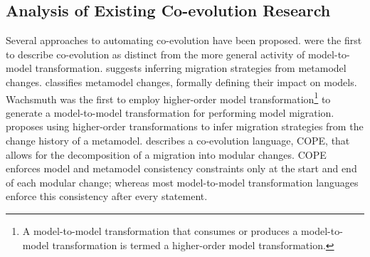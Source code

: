 \subsection{Analysis of Existing Co-evolution Research}
\label{sub:analysis_of_existing_techniques}
Several approaches to automating co-evolution have been proposed. \cite{sprinkle04domain} were the first to describe co-evolution as distinct from the more general activity of model-to-model transformation. \cite{gruschko07towards} suggests inferring migration strategies from metamodel changes. \cite{wachsmuth07metamodel} classifies metamodel changes, formally defining their impact on models. Wachsmuth was the first to employ higher-order model transformation\footnote{A model-to-model transformation that consumes or produces a model-to-model transformation is termed a higher-order model transformation.} to generate a model-to-model transformation for performing model migration. \cite{cicchetti08automating} proposes using higher-order transformations to infer migration strategies from the change history of a metamodel. \cite{herrmannsdoerfer08cope} describes a co-evolution language, COPE, that allows for the decomposition of a migration into modular changes. COPE enforces model and metamodel consistency constraints only at the start and end of each modular change; whereas most model-to-model transformation languages enforce this consistency after every statement.




